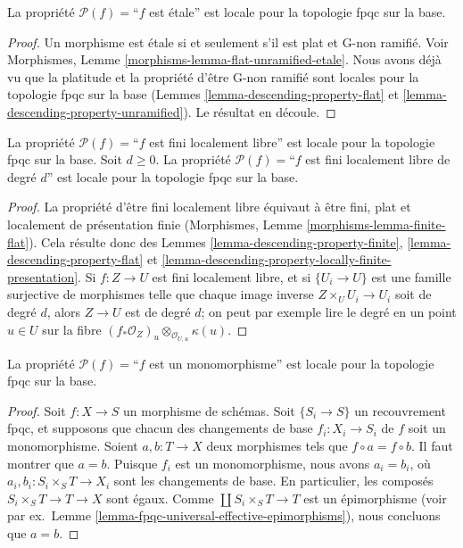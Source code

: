 \begin{lemma}
\label{lemma-descending-property-etale}
La propriété $\mathcal{P}(f) =$``$f$ est \'etale''
est locale pour la topologie fpqc sur la base.
\end{lemma}

\begin{proof}
Un morphisme est \'etale si et seulement s'il est plat et G-non ramifié.
Voir Morphismes, Lemme \ref{morphisms-lemma-flat-unramified-etale}.
Nous avons déjà vu que la platitude et la propriété d'être G-non ramifié
sont locales pour la topologie fpqc sur la base (Lemmes
\ref{lemma-descending-property-flat} et
\ref{lemma-descending-property-unramified}).
Le résultat en découle.
\end{proof}

\begin{lemma}
\label{lemma-descending-property-finite-locally-free}
La propriété $\mathcal{P}(f) =$``$f$ est fini localement libre''
est locale pour la topologie fpqc sur la base.
Soit $d \geq 0$.
La propriété $\mathcal{P}(f) =$``$f$ est fini localement libre de degré $d$''
est locale pour la topologie fpqc sur la base.
\end{lemma}

\begin{proof}
La propriété d'être fini localement libre équivaut à être
fini, plat et localement de présentation finie
(Morphismes, Lemme \ref{morphisms-lemma-finite-flat}).
Cela résulte donc des Lemmes
\ref{lemma-descending-property-finite},
\ref{lemma-descending-property-flat} et
\ref{lemma-descending-property-locally-finite-presentation}.
Si $f : Z \to U$ est fini localement libre, et si $\{U_i \to U\}$ est une
famille surjective de morphismes telle que chaque image inverse
$Z \times_U U_i \to U_i$ soit de degré $d$, alors $Z \to U$ est de degré $d$;
on peut par exemple lire le degré en un point $u \in U$ sur la fibre
$(f_*\mathcal{O}_Z)_u \otimes_{\mathcal{O}_{U, u}} \kappa(u)$.
\end{proof}

\begin{lemma}
\label{lemma-descending-property-monomorphism}
La propriété $\mathcal{P}(f) =$``$f$ est un monomorphisme''
est locale pour la topologie fpqc sur la base.
\end{lemma}

\begin{proof}
Soit $f : X \to S$ un morphisme de schémas.
Soit $\{S_i \to S\}$ un recouvrement fpqc, et supposons que chacun des
changements de base $f_i : X_i \to S_i$ de $f$ soit un monomorphisme.
Soient $a, b : T \to X$ deux morphismes tels que
$f \circ a = f \circ b$. Il faut montrer que $a = b$.
Puisque $f_i$ est un monomorphisme, nous avons $a_i = b_i$, où
$a_i, b_i : S_i \times_S T \to X_i$ sont les changements de base.
En particulier, les composés
$S_i \times_S T \to T \to X$ sont égaux.
Comme $\coprod S_i \times_S T \to T$
est un épimorphisme (voir
par ex.\ Lemme \ref{lemma-fpqc-universal-effective-epimorphisms}),
nous concluons que $a = b$.
\end{proof}


